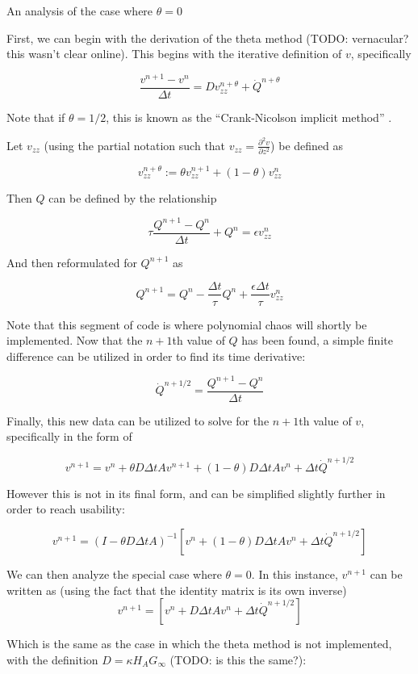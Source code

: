 \documentclass[12pt,letterpaper]{article}
\author{Jordan Bayles}
\date{}
\title{}
\newcommand{\pd}[2]{\frac{\partial#1}{\partial#2}}
\begin{document}
\begin{center}
An analysis of the case where $\theta = 0$
\end{center}
First, we can begin with the derivation of the theta method (TODO: vernacular? 
this wasn't clear online). This begins with the iterative definition of $v$, specifically

\[\frac{v^{n+1} - v^n}{\Delta t} = D v_{zz}^{n+\theta} + \dot{Q}^{n+\theta} \]

Note that if $\theta = 1/2$, this is known as the ``Crank-Nicolson implicit method''
\cite{cj}.

Let $v_{zz}$ (using the partial notation such that $v_{zz} = \pd{^2v}{z^2}$) be defined as

\[ v_{zz}^{n+\theta} := \theta v_{zz}^{n+1} + (1-\theta) v_{zz}^n \]

Then $Q$ can be defined by the relationship

\[ \tau \frac{Q^{n+1} - Q^n}{\Delta t} + Q^n = \epsilon v_{zz}^n \]

And then reformulated for $Q^{n+1}$ as

\[Q^{n+1} = Q^n - \frac{\Delta t}{\tau} Q^n + \frac{\epsilon \Delta t}{\tau} v_{zz}^n \]

Note that this segment of code is where polynomial chaos will shortly be
implemented. Now that the $n+1$th value of $Q$ has been found, a simple finite difference
can be utilized in order to find its time derivative:

\[ \dot{Q}^{n+1/2} = \frac{Q^{n+1} - Q^n}{\Delta t} \]

Finally, this new data can be utilized to solve for the $n+1$th value of $v$, specifically
in the form of

\[v^{n+1} = v^n + \theta D \Delta t A v^{n+1} + (1-\theta) D \Delta t A v^n
  + \Delta t \dot{Q}^{n+1/2} \]

However this is not in its final form, and can be simplified slightly further in order
to reach usability:

\[v^{n+1} = (I-\theta D \Delta t A)^{-1}
\left[v^n + (1-\theta) D \Delta t A v^n + \Delta t \dot{Q}^{n+1/2} \right] \]

We can then analyze the special case where $\theta = 0$. In this instance, $v^{n+1}$
can be written as (using the fact that the identity matrix is its own inverse)
\[v^{n+1} = \left[v^n + D \Delta t A v^n + \Delta t \dot{Q}^{n+1/2} \right] \]

Which is the same as the case in which the theta method is not implemented, with the
definition $D = \kappa H_A G_{\infty}$ (TODO: is this the same?):
\end{document}
